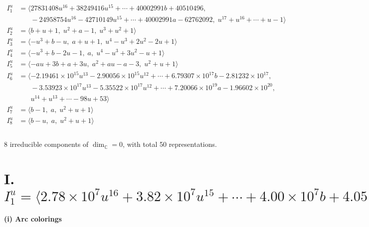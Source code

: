 \documentclass[1p]{elsarticle_modified}
\theoremstyle{definition}
\begin{document}
\begin{align*}
I^u_{1}&=\langle 
27831408 u^{16}+38249416 u^{15}+\cdots+40002991 b+40510496,\\
\phantom{I^u_{1}}&\phantom{= \langle  }-24958754 u^{16}-42710149 u^{15}+\cdots+40002991 a-62762092,\;u^{17}+u^{16}+\cdots+u-1\rangle \\
I^u_{2}&=\langle 
b+u+1,\;u^2+a-1,\;u^3+u^2+1\rangle \\
I^u_{3}&=\langle 
- u^3+b- u,\;a+u+1,\;u^4- u^3+2 u^2-2 u+1\rangle \\
I^u_{4}&=\langle 
- u^3+b-2 u-1,\;a,\;u^4- u^3+3 u^2- u+1\rangle \\
I^u_{5}&=\langle 
- a u+3 b+a+3 u,\;a^2+a u- a-3,\;u^2+u+1\rangle \\
I^u_{6}&=\langle 
-2.19461\times10^{15} u^{13}-2.90056\times10^{15} u^{12}+\cdots+6.79307\times10^{17} b-2.81232\times10^{17},\\
\phantom{I^u_{6}}&\phantom{= \langle  }-3.53923\times10^{17} u^{13}-5.35522\times10^{17} u^{12}+\cdots+7.20066\times10^{19} a-1.96602\times10^{20},\\
\phantom{I^u_{6}}&\phantom{= \langle  }u^{14}+u^{13}+\cdots-98 u+53\rangle \\
I^u_{7}&=\langle 
b-1,\;a,\;u^2+u+1\rangle \\
I^u_{8}&=\langle 
b- u,\;a,\;u^2+u+1\rangle \\
\\
\end{align*}
\raggedright * 8 irreducible components of $\dim_{\mathbb{C}}=0$, with total 50 representations.\\
\newpage
\renewcommand{\arraystretch}{1}
\centering \section*{I. $I^u_{1}= \langle 2.78\times10^{7} u^{16}+3.82\times10^{7} u^{15}+\cdots+4.00\times10^{7} b+4.05\times10^{7},\;-2.50\times10^{7} u^{16}-4.27\times10^{7} u^{15}+\cdots+4.00\times10^{7} a-6.28\times10^{7},\;u^{17}+u^{16}+\cdots+u-1 \rangle$}
\flushleft \textbf{(i) Arc colorings}\\
\end{document}
